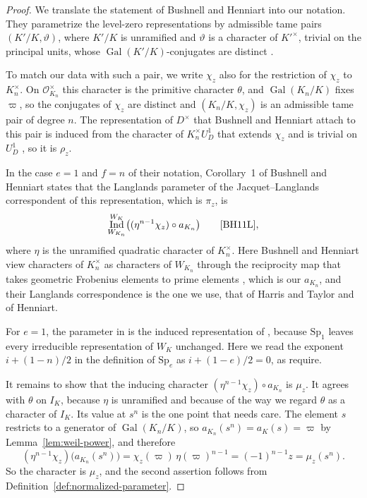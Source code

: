 \documentclass[a4paper,11pt]{amsart}
\theoremstyle{definition}
\theoremstyle{remark}
\numberwithin{equation}{section}
\DeclareMathOperator{\Gal}{Gal}
\newcommand{\OO}{\mathcal{O}}
\DeclareMathOperator{\Ind}{Ind}
\begin{document}
\begin{proof}
We translate the statement of Bushnell and Henniart into our notation. They parametrize the level-zero representations by admissible tame pairs $(K'/K,\vartheta)$, where $K'/K$ is unramified and $\vartheta$ is a character of $K'^\times$, trivial on the principal units, whose $\Gal(K'/K)$-conjugates are distinct \cite[1.1]{BH11L}.

To match our data with such a pair, we write $\chi_z$ also for the restriction of $\chi_z$ to $K_n^\times$. On $\OO_{K_n}^\times$ this character is the primitive character $\theta$, and $\Gal(K_n/K)$ fixes $\varpi$, so the conjugates of $\chi_z$ are distinct and $(K_n/K,\chi_z)$ is an admissible tame pair of degree $n$. The representation of $D^\times$ that Bushnell and Henniart attach to this pair is induced from the character of $K_n^\times U_D^1$ that extends $\chi_z$ and is trivial on $U_D^1$ \cite[(1.5.1)]{BH11L}, so it is $\rho_z$.

In the case $e=1$ and $f=n$ of their notation, Corollary~1 of Bushnell and Henniart states that the Langlands parameter of the Jacquet--Langlands correspondent of this representation, which is $\pi_z$, is
\[
 \Ind_{W_{K_n}}^{W_K}\bigl((\eta^{n-1}\chi_z)\circ a_{K_n}\bigr) \qquad\text{\cite[6.3, Corollary~1, (1.4.1) and (1.4.3)]{BH11L}},
\]
where $\eta$ is the unramified quadratic character of $K_n^\times$. Here Bushnell and Henniart view characters of $K_n^\times$ as characters of $W_{K_n}$ through the reciprocity map that takes geometric Frobenius elements to prime elements \cite[1.4]{BH11L}, which is our $a_{K_n}$, and their Langlands correspondence is the one we use, that of Harris and Taylor and of Henniart.

For $e=1$, the parameter in \cite[(1.4.3)]{BH11L} is the induced representation of \cite[(1.4.1)]{BH11L}, because $\mathrm{Sp}_1$ leaves every irreducible representation of $W_K$ unchanged. Here we read the exponent $i+(1-n)/2$ in the definition of $\mathrm{Sp}_e$ \cite[1.2]{BH11L} as $i+(1-e)/2=0$, as \cite[3.1, (3.2.1) and Lemma~13]{BH11L} require.

It remains to show that the inducing character $(\eta^{n-1}\chi_z)\circ a_{K_n}$ is $\mu_z$. It agrees with $\theta$ on $I_K$, because $\eta$ is unramified and because of the way we regard $\theta$ as a character of $I_K$. Its value at $s^n$ is the one point that needs care. The element $s$ restricts to a generator of $\Gal(K_n/K)$, so $a_{K_n}(s^n)=a_K(s)=\varpi$ by Lemma~\ref{lem:weil-power}, and therefore
\[
 (\eta^{n-1}\chi_z)\bigl(a_{K_n}(s^n)\bigr) = \chi_z(\varpi)\,\eta(\varpi)^{n-1}=(-1)^{n-1}z=\mu_z(s^n).
\]
So the character is $\mu_z$, and the second assertion follows from Definition~\ref{def:normalized-parameter}.
\end{proof}
\end{document}
